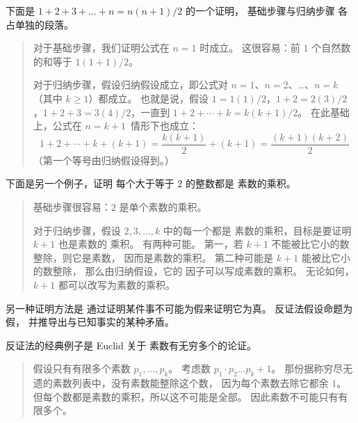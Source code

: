 下面是 \( 1+2+3+\dots+n=n(n+1)/2 \) 的一个证明，
基础步骤与归纳步骤
各占单独的段落。
\begin{quote}\small
对于基础步骤，我们证明公式在 \( n=1 \) 时成立。
这很容易：前 \( 1 \) 个自然数的和等于
\( 1(1+1)/2 \)。

对于归纳步骤，假设归纳假设成立，即公式对
\( n=1 \)、\( n=2 \)、\ldots{}、\( n=k \)（其中 $k\geq 1$）都成立。
也就是说，假设
$1=1(1)/2$，$1+2=2(3)/2$，$1+2+3=3(4)/2$，一直到
$1+2+\cdots+k=k(k+1)/2$。
在此基础上，公式在 \( n=k+1 \)~情形下也成立：
\begin{equation*}
  1+2+\cdots+k+(k+1)
  =
  \frac{k(k+1)}{2}+(k+1)
  =
  \frac{(k+1)(k+2)}{2}
\end{equation*}
（第一个等号由归纳假设得到。）
\end{quote}

下面是另一个例子，证明
每个大于等于 \( 2 \) 的整数都是
素数的乘积。
\begin{quote}\small
基础步骤很容易：\( 2 \) 是单个素数的乘积。

对于归纳步骤，假设 \( 2, 3,\ldots ,k \) 中的每一个都是
素数的乘积，目标是要证明 \( k+1 \) 也是素数的
乘积。
有两种可能。
第一，若 \( k+1 \) 不能被比它小的数整除，则它是素数，
因而是素数的乘积。
第二种可能是 \( k+1 \) 能被比它小的数整除，
那么由归纳假设，它的
因子可以写成素数的乘积。
无论如何，
\( k+1 \) 都可以改写为素数的乘积。
\end{quote}





另一种证明方法是
通过证明某件事不可能为假来证明它为真。
反证法假设命题为假，
并推导出与已知事实的某种矛盾。

反证法的经典例子是 Euclid 关于
素数有无穷多个的论证。
\begin{quote}\small
假设只有有限多个素数 \( p_1,\dots,p_k \)。
考虑数 \( p_1\cdot p_2\dots p_k +1 \)。
那份据称穷尽无遗的素数列表中，没有素数能整除这个数，
因为每个素数去除它都余 \( 1 \)。
但每个数都是素数的乘积，所以这不可能是全部。
因此素数不可能只有有限多个。
\end{quote}

